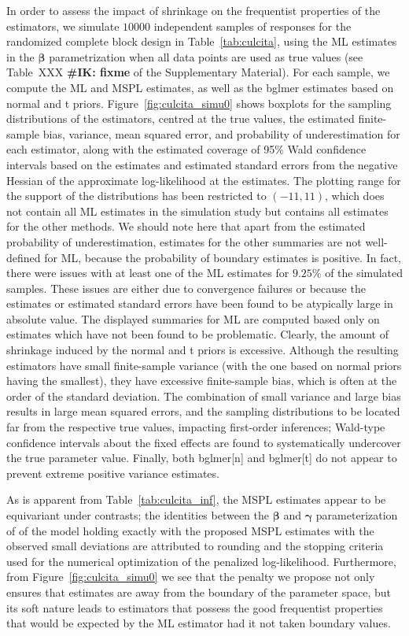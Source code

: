 \documentclass[11pt, a4paper]{article}
\newcommand*{\bb}{\boldsymbol}
\newcommand{\IK}[1]{{\noindent \color{blue} \bf \#IK: #1}}
\theoremstyle{example} \newtheorem{example}{Example}[section]
\theoremstyle{theorem} \newtheorem{theorem}{Theorem}[section]
\def\bbeta{\bb{\beta}}
\def\bgamma{\bb{\gamma}}
\def\bgamma{\bb{\gamma}}
\begin{document}
In order to assess the impact of shrinkage on the frequentist
properties of the estimators, we simulate $10000$ independent samples
of responses for the randomized complete block design in
Table~\ref{tab:culcita}, using the ML estimates in the $\bbeta$
parametrization when all data points are used as true values (see
Table~XXX \IK{fixme} of the Supplementary Material). For
each sample, we compute the ML and MSPL estimates, as well as the
bglmer estimates based on normal and t priors.
Figure~\ref{fig:culcita_simu0} shows boxplots for the sampling
distributions of the estimators, centred at the true values, the
estimated finite-sample bias, variance, mean squared error, and
probability of underestimation for each estimator, along with the
estimated coverage of 95\% Wald confidence intervals based on the
estimates and estimated standard errors from the negative Hessian of
the approximate log-likelihood at the estimates. The plotting range
for the support of the distributions has been restricted to
$(-11, 11)$, which does not contain all ML estimates in the
simulation study but contains all estimates for the other methods. We
should note here that apart from the estimated probability of
underestimation, estimates for the other summaries are not
well-defined for ML, because the probability of boundary estimates is
positive. In fact, there were issues with at least one of the ML
estimates for $9.25\%$ of the simulated samples. These issues are
either due to convergence failures or because the estimates or
estimated standard errors have been found to be atypically large in
absolute value. The displayed summaries for ML are computed based
only on estimates which have not been found to be
problematic. Clearly, the amount of shrinkage induced by the normal
and t priors is excessive. Although the resulting estimators have
small finite-sample variance (with the one based on normal priors
having the smallest), they have excessive finite-sample bias, which is
often at the order of the standard deviation.  The combination of
small variance and large bias results in large mean squared errors,
and the sampling distributions to be located far from the respective
true values, impacting first-order inferences; Wald-type confidence
intervals about the fixed effects are found to systematically
undercover the true parameter value. Finally, both bglmer[n] and
bglmer[t] do not appear to prevent extreme positive variance estimates.

As is apparent from Table~\ref{tab:culcita_inf}, the MSPL estimates
appear to be equivariant under contrasts; the identities between the
$\bbeta$ and $\bgamma$ parameterization of of the model holding
exactly with the proposed MSPL estimates with the observed small
deviations are attributed to rounding and the stopping criteria used
for the numerical optimization of the penalized
log-likelihood. Furthermore, from Figure~\ref{fig:culcita_simu0} we
see that the penalty we propose not only ensures that estimates are
away from the boundary of the parameter space, but its soft nature
leads to estimators that possess the good frequentist properties that
would be expected by the ML estimator had it not taken boundary
values.
\end{document}
